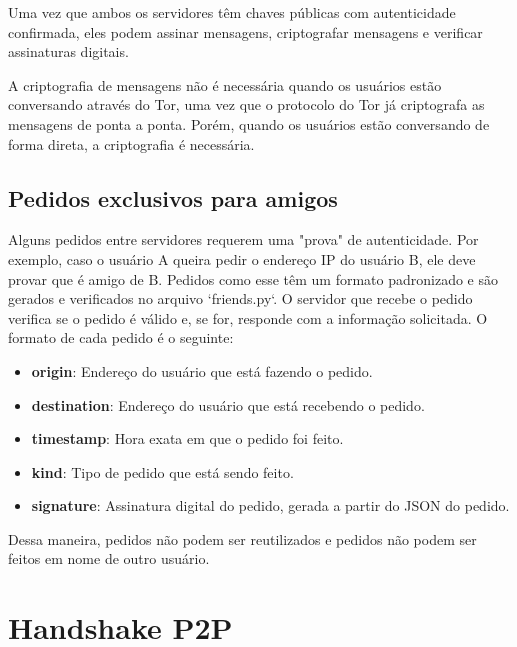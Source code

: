 Uma vez que ambos os servidores têm chaves públicas com autenticidade confirmada, eles podem assinar mensagens, criptografar mensagens e verificar assinaturas digitais.

A criptografia de mensagens não é necessária quando os usuários estão conversando através do Tor, uma vez que o protocolo do Tor já criptografa as mensagens de ponta a ponta. Porém, quando os usuários estão conversando de forma direta, a criptografia é necessária.

\subsection{Pedidos exclusivos para amigos}

Alguns pedidos entre servidores requerem uma "prova" de autenticidade. Por exemplo, caso o usuário A queira pedir o endereço IP do usuário B, ele deve provar que é amigo de B. Pedidos como esse têm um formato padronizado e são gerados e verificados no arquivo `friends.py`. O servidor que recebe o pedido verifica se o pedido é válido e, se for, responde com a informação solicitada. O formato de cada pedido é o seguinte:

\begin{itemize}
    \item \textbf{origin}: Endereço do usuário que está fazendo o pedido.
    \item \textbf{destination}: Endereço do usuário que está recebendo o pedido.
    \item \textbf{timestamp}: Hora exata em que o pedido foi feito.
    \item \textbf{kind}: Tipo de pedido que está sendo feito.
    \item \textbf{signature}: Assinatura digital do pedido, gerada a partir do JSON do pedido.
\end{itemize}

Dessa maneira, pedidos não podem ser reutilizados e pedidos não podem ser feitos em nome de outro usuário.

\section{Handshake P2P}

